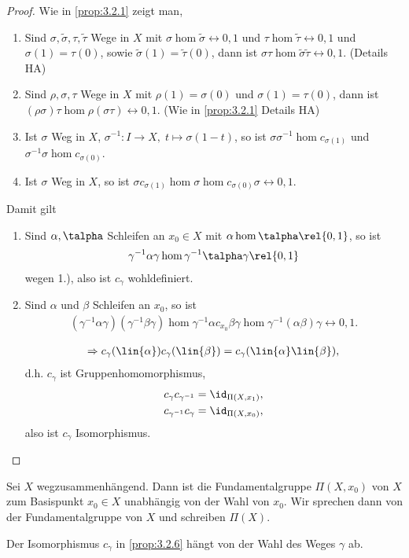 \begin{proof}
Wie in \ref{prop:3.2.1} zeigt man,
\begin{enumerate}[label=\arabic{*}.)]
  \item\label{proof:3.2.6:1} Sind $\sigma,\tilde{\sigma},\tau,\tilde{\tau}$ Wege
  in $X$ mit $\sigma\hom\tilde{\sigma} \rel{0,1}$ und $\tau\hom\tilde{\tau} \rel{0,1}$ und
  $\sigma(1) = \tau(0)$, sowie $\tilde{\sigma}(1)=\tilde{\tau}(0)$, dann ist
  $\sigma\tau \hom\tilde{\sigma}\tilde{\tau} \rel{0,1}$. (Details HA)
  \item\label{proof:3.2.6:2} Sind $\rho,\sigma,\tau$ Wege in $X$ mit $\rho(1) =
  \sigma(0)$ und $\sigma(1) = \tau(0)$, dann ist
  $(\rho\sigma)\tau\hom\rho(\sigma\tau)\rel{0,1}$. (Wie in \ref{prop:3.2.1}
  Details HA)
  \item\label{proof:3.2.6:3} Ist $\sigma$ Weg in $X$, $\sigma^{-1}: I\to
  X,\;t\mapsto \sigma(1-t)$, so ist $\sigma\sigma^{-1}\hom c_{\sigma(1)}$ und $\sigma^{-1}\sigma\hom
  c_{\sigma(0)}$.
  \item\label{proof:3.2.6:4} Ist $\sigma$ Weg in $X$, so ist $\sigma
  c_{\sigma(1)} \hom \sigma\hom c_{\sigma(0)}\sigma\rel{0,1}$.
\end{enumerate}
Damit gilt
\begin{enumerate}[label=(\alph{*})]
  \item Sind $\alpha,\talpha$ Schleifen an
  $x_0\in X$  mit $\alpha\hom\talpha\rel{0,1}$, so ist
  \begin{align*}
  \gamma^{-1}\alpha\gamma\hom
  \gamma^{-1}\talpha\gamma\rel{0,1}
  \end{align*}
  wegen 1.), also ist $c_\gamma$ wohldefiniert.
  \item Sind $\alpha$ und $\beta$ Schleifen an $x_0$, so ist
\begin{align*}
  (\gamma^{-1}\alpha\gamma)(\gamma^{-1}\beta\gamma) \hom \gamma^{-1}\alpha
  c_{x_0} \beta \gamma\hom \gamma^{-1}(\alpha\beta)\gamma\rel{0,1}.
\end{align*}

\begin{align*}
\Rightarrow c_\gamma(\lin{\alpha}) c_\gamma(\lin{\beta}) =
c_\gamma(\lin{\alpha}\lin{\beta}),
\end{align*}
d.h. $c_\gamma$ ist Gruppenhomomorphismus,
\begin{align*}
&c_\gamma c_{\gamma^{-1}} = \id_{\Pi(X,x_1)},\\
&c_{\gamma^{-1}}c_\gamma = \id_{\Pi(X,x_0)},
\end{align*}
also ist $c_\gamma$ Isomorphismus.\qedhere
\end{enumerate}
\end{proof}
\begin{cor}
\label{prop:3.2.7}
Sei $X$ wegzusammenhängend. Dann ist die Fundamentalgruppe $\Pi(X,x_0)$ von $X$
zum Basispunkt $x_0\in X$ unabhängig von der Wahl von $x_0$. Wir sprechen dann
von der Fundamentalgruppe von $X$ und schreiben $\Pi(X)$.\fishhere
\end{cor}
\begin{bemn}
Der Isomorphismus $c_\gamma$ in \ref{prop:3.2.6} hängt von der Wahl des Weges
$\gamma$ ab.\maphere
\end{bemn}


